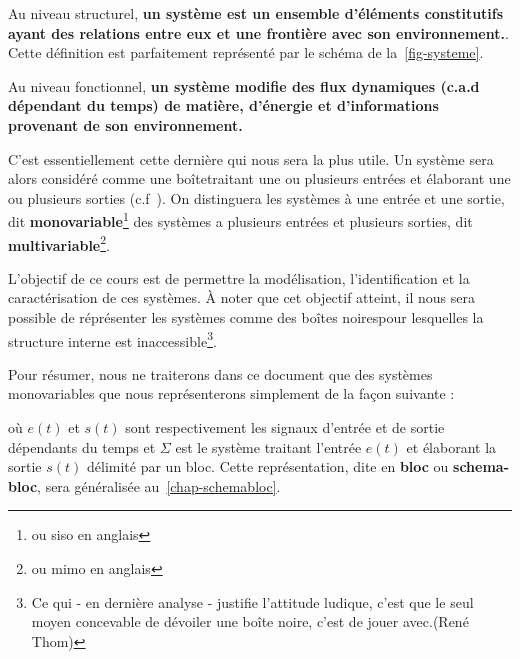 Au niveau structurel, \textbf{un système est un ensemble 
d'éléments constitutifs ayant des relations entre eux et 
une frontière avec son environnement.}. Cette définition est parfaitement
représenté par le schéma de la~\cref{fig-systeme}.

Au niveau fonctionnel, \textbf{un système modifie des flux dynamiques 
(c.a.d dépendant du temps) de matière, d'énergie et d'informations provenant 
de son environnement.}

C'est essentiellement cette dernière qui nous sera la plus utile.
Un système sera alors considéré comme 
une \og boîte\fg traitant une ou plusieurs entrées et élaborant une ou 
plusieurs sorties (c.f~). On distinguera les systèmes à 
une entrée et une sortie, dit \textbf{monovariable}\footnote{ou \gls{siso} 
en anglais} des systèmes  a plusieurs entrées et plusieurs sorties, dit 
\textbf{multivariable}\footnote{ou \gls{mimo} en anglais}.

L'objectif de ce cours est de permettre la modélisation, 
l'identification et la caractérisation de ces systèmes. 
\`A noter que cet objectif atteint, il nous sera possible de réprésenter 
les systèmes comme des \og boîtes noires\fg pour lesquelles la structure 
interne est inaccessible\footnote{\og Ce qui - en dernière analyse - justifie 
l'attitude ludique, c'est que le seul moyen concevable de dévoiler une 
boîte noire, c'est de jouer avec.\fg (René Thom)}. %

Pour résumer, nous ne traiterons dans ce document 
que des systèmes monovariables que 
nous représenterons simplement de la façon suivante :
\begin{center}
    
\end{center}
où $e(t)$ et $s(t)$ sont respectivement les signaux d'entrée et de sortie 
dépendants du temps et $\Sigma$ est le système traitant l'entrée $e(t)$ et 
élaborant la sortie $s(t)$ délimité par un bloc. 
Cette représentation, dite en \textbf{bloc} ou 
\textbf{schema-bloc}, sera généralisée au~\cref{chap-schemabloc}.
